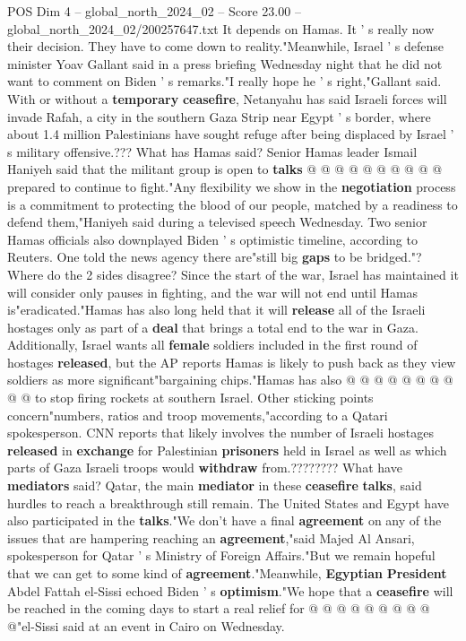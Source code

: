 \begin{textsample}{POS Dim 4 – global\_north\_2024\_02 – Score 23.00 – global\_north\_2024\_02/200257647.txt}
It depends on Hamas.
It ' s really now their decision.
They have to come down to reality."Meanwhile, Israel ' s defense minister Yoav Gallant said in a press briefing Wednesday night that he did not want to comment on Biden ' s remarks."I really hope he ' s right,"Gallant said.
With or without a \textbf{temporary} \textbf{ceasefire}, Netanyahu has said Israeli forces will invade Rafah, a city in the southern Gaza Strip near Egypt ' s border, where about 1.4 million Palestinians have sought refuge after being displaced by Israel ' s military offensive.???
What has Hamas said?
Senior Hamas leader Ismail Haniyeh said that the militant group is open to \textbf{talks} @ @ @ @ @ @ @ @ @ @ prepared to continue to fight."Any flexibility we show in the \textbf{negotiation} process is a commitment to protecting the blood of our people, matched by a readiness to defend them,"Haniyeh said during a televised speech Wednesday.
Two senior Hamas officials also downplayed Biden ' s optimistic timeline, according to Reuters.
One told the news agency there are"still big \textbf{gaps} to be bridged."?
Where do the 2 sides disagree?
Since the start of the war, Israel has maintained it will consider only pauses in fighting, and the war will not end until Hamas is"eradicated."Hamas has also long held that it will \textbf{release} all of the Israeli hostages only as part of a \textbf{deal} that brings a total end to the war in Gaza.
Additionally, Israel wants all \textbf{female} soldiers included in the first round of hostages \textbf{released}, but the AP reports Hamas is likely to push back as they view soldiers as more significant"bargaining chips."Hamas has also @ @ @ @ @ @ @ @ @ @ to stop firing rockets at southern Israel.
Other sticking points concern"numbers, ratios and troop movements,"according to a Qatari spokesperson.
CNN reports that likely involves the number of Israeli hostages \textbf{released} in \textbf{exchange} for Palestinian \textbf{prisoners} held in Israel as well as which parts of Gaza Israeli troops would \textbf{withdraw} from.????????
What have \textbf{mediators} said?
Qatar, the main \textbf{mediator} in these \textbf{ceasefire} \textbf{talks}, said hurdles to reach a breakthrough still remain.
The United States and Egypt have also participated in the \textbf{talks}."We don't have a final \textbf{agreement} on any of the issues that are hampering reaching an \textbf{agreement},"said Majed Al Ansari, spokesperson for Qatar ' s Ministry of Foreign Affairs."But we remain hopeful that we can get to some kind of \textbf{agreement}."Meanwhile, \textbf{Egyptian} \textbf{President} Abdel Fattah el-Sissi echoed Biden ' s \textbf{optimism}."We hope that a \textbf{ceasefire} will be reached in the coming days to start a real relief for @ @ @ @ @ @ @ @ @ @"el-Sissi said at an event in Cairo on Wednesday.

\end{textsample}
